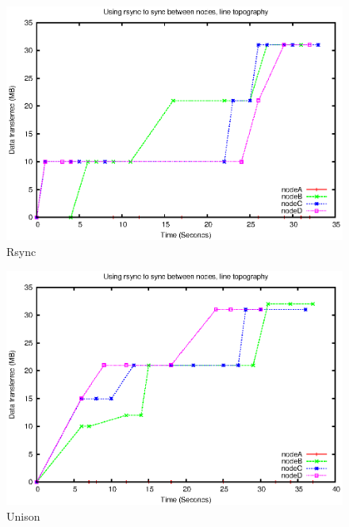 \documentclass[12pt]{article}
\begin{document}
\begin{figure}[ht!]
    \centering
    \includegraphics[height=0.4\textheight]{images/line-rsync-10-fixes.eps}
    \caption{Rsync}
    \label{fig:line_rsync}
\end{figure}

\begin{figure}[hb!]
    \centering
    \includegraphics[height=0.4\textheight]{images/line-uni-10-fixes.eps}
    \caption{Unison}
    \label{fig:line_uni}
\end{figure}
\pagebreak
\end{document}
